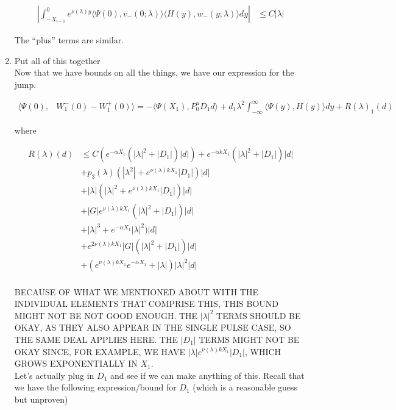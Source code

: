 \documentclass[12pt]{article}
\begin{document}
\begin{enumerate}
\begin{align*}
\left| \int_{-X_{i-1}}^0 e^{\nu(\lambda)y} \langle \Psi(0), v_-(0; \lambda) \rangle
\langle H(y), w_-(y; \lambda) \rangle dy \right| 
&\leq C |\lambda| 
\end{align*}

The ``plus'' terms are similar.

\item Put all of this together\\

Now that we have bounds on all the things, we have our expression for the jump.

\begin{align*}
\langle \Psi(0), &W_1^-(0) - W_1^+(0) \rangle = 
-\langle \Psi(X_1), P^u_0 D_1 d \rangle + d_1 \lambda^2 \int_{-\infty}^\infty \langle \Psi(y), H(y) \rangle dy + R(\lambda)_1(d)
\end{align*}

where

\begin{align*}
R(\lambda)(d) &\leq C( e^{-\alpha X_1}( |\lambda|^2 + |D_1|)|d|) + e^{-\alpha k X_1} ( |\lambda|^2 + |D_1|) |d| \\
&+ p_3(\lambda) (|\lambda^2| + e^{\nu(\lambda)k X_1}|D_1|)|d| \\
&+ |\lambda| (|\lambda|^2 + e^{\nu(\lambda)k X_1} |D_1|)|d| \\
&+ |G| e^{\nu(\lambda)k X_1} ( |\lambda|^2 + |D_1| )|d| \\ 
&+ |\lambda|^3 + e^{-\alpha X_1} |\lambda|^2 )|d| \\
&+ e^{2 \nu(\lambda) k X_1} |G| ( |\lambda|^2 + |D_1| )|d| \\
&+ (e^{\nu(\lambda)k X_1} e^{-\alpha X_1} + |\lambda|)|\lambda|^2|d|\\
\end{align*}

BECAUSE OF WHAT WE MENTIONED ABOUT WITH THE INDIVIDUAL ELEMENTS THAT COMPRISE THIS, THIS BOUND MIGHT NOT BE NOT GOOD ENOUGH. THE $|\lambda|^2$ TERMS SHOULD BE OKAY, AS THEY ALSO APPEAR IN THE SINGLE PULSE CASE, SO THE SAME DEAL APPLIES HERE. THE $|D_1|$ TERMS MIGHT NOT BE OKAY SINCE, FOR EXAMPLE, WE HAVE $|\lambda| e^{\nu(\lambda)k X_1} |D_1|$, WHICH GROWS EXPONENTIALLY IN $X_1$.\\

Let's actually plug in $D_1$ and see if we can make anything of this. Recall that we have the following expression/bound for $D_1$ (which is a reasonable guess but unproven)


\end{enumerate}
\end{document}
